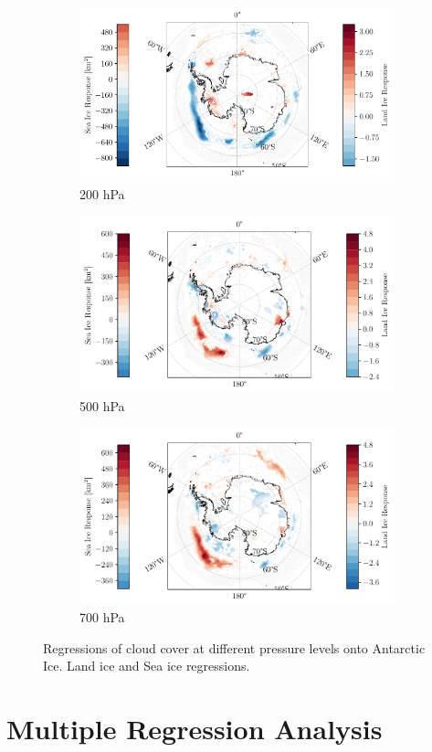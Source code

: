 \documentclass[../main.tex]{subfiles}
\begin{document}
\begin{figure}[hbt!]
    \centering
    \begin{subfigure}[b]{0.8\textwidth}
    \includegraphics[width=\textwidth]{images/T2/single_regression/hres/cc_200_0.05}
    \caption{200 hPa}
    \end{subfigure}
    \begin{subfigure}[b]{0.8\textwidth}
    \includegraphics[width=\textwidth]{images/T2/single_regression/hres/cc_500_0.05}
    \caption{500 hPa}
    \end{subfigure}
    \begin{subfigure}[b]{0.8\textwidth}
    \includegraphics[width=\textwidth]{images/T2/single_regression/hres/cc_700_0.05}
    \caption{700 hPa}
    \end{subfigure}
    \caption{Regressions of cloud cover at different pressure levels onto Antarctic Ice. Land ice and Sea ice regressions.}
    \label{fig:regressions_cc_700_0.05}
\end{figure}

\section{Multiple Regression Analysis}
\end{document}
